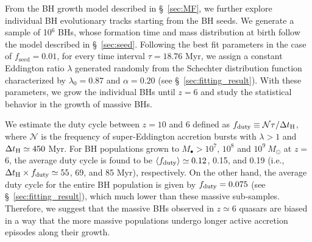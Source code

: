 \documentclass[twocolumn, twocolappendix]{aastex63}
\newcommand{\Msun}{M_\odot}
\newcommand{\tlife}{\tau}
\newcommand{\fseed}{f_\mathrm{seed}}
\newcommand{\blue}[1]{\textcolor{blue}{ #1}}
\begin{document}
\begin{CJK*}{UTF8}{gbsn}
From the BH growth model described in \S~\ref{sec:MF}, we further explore individual BH evolutionary tracks starting from the BH seeds.
We generate a sample of 10$^6$ BHs, whose formation time and mass distribution at birth follow the model described in \S~\ref{sec:seed}. 
Following the best fit parameters in the case of $\fseed = 0.01$,
for every time interval $\tlife=18.76$ Myr,
we assign a constant Eddington ratio $\lambda$ generated randomly from the Schechter distribution function 
characterized by $\lambda_0=0.87$ and $\alpha=0.20$ (see \S~\ref{sec:fitting_result}).
With these parameters, we grow the individual BHs until $z=6$ and 
study the statistical behavior in the growth of massive BHs.

We estimate the duty cycle between $z=10$ and $6$ defined as $f_{\rm duty} \equiv \mathcal{N}\tlife/\Delta t_{\rm H}$, 
where $\mathcal{N}$ is the frequency of super-Eddington accretion bursts with $\lambda>1$ and $\Delta t_{\rm H}\simeq 450$ Myr.
For BH populations grown to $M_\bullet>10^7$, $10^8$ and $10^9~\Msun$ at $z=$ 6,
the average duty cycle is found to be $\langle f_{\rm duty}\rangle \simeq 0.12$, 0.15, and 0.19
(i.e., $\Delta t_{\rm H} \times f_{\rm duty} \simeq 55$, 69, and 85 Myr), respectively.
On the other hand, the average duty cycle for the entire BH population is given by $f_{\rm duty}= 0.075$ 
(see \S~\ref{sec:fitting_result}), which much lower than these massive sub-samples.
Therefore, we suggest that the massive BHs observed in $z\simeq 6$ quasars are biased in a way that
the more massive populations undergo longer active accretion episodes along their growth.



\end{CJK*}
\end{document}
